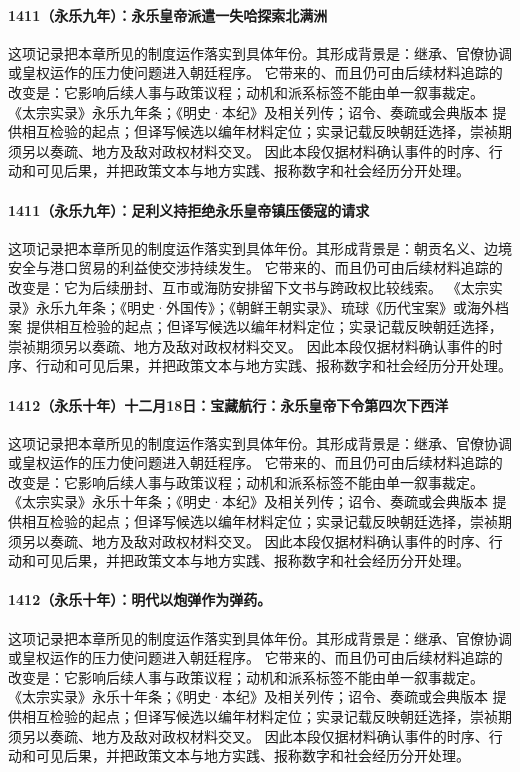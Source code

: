 \paragraph{1411（永乐九年）：永乐皇帝派遣一失哈探索北满洲} 这项记录把本章所见的制度运作落实到具体年份。其形成背景是：继承、官僚协调或皇权运作的压力使问题进入朝廷程序。 它带来的、而且仍可由后续材料追踪的改变是：它影响后续人事与政策议程；动机和派系标签不能由单一叙事裁定。 《太宗实录》永乐九年条；《明史·本纪》及相关列传；诏令、奏疏或会典版本 提供相互检验的起点；但译写候选以编年材料定位；实录记载反映朝廷选择，崇祯期须另以奏疏、地方及敌对政权材料交叉。 因此本段仅据材料确认事件的时序、行动和可见后果，并把政策文本与地方实践、报称数字和社会经历分开处理。

\paragraph{1411（永乐九年）：足利义持拒绝永乐皇帝镇压倭寇的请求} 这项记录把本章所见的制度运作落实到具体年份。其形成背景是：朝贡名义、边境安全与港口贸易的利益使交涉持续发生。 它带来的、而且仍可由后续材料追踪的改变是：它为后续册封、互市或海防安排留下文书与跨政权比较线索。 《太宗实录》永乐九年条；《明史·外国传》；《朝鲜王朝实录》、琉球《历代宝案》或海外档案 提供相互检验的起点；但译写候选以编年材料定位；实录记载反映朝廷选择，崇祯期须另以奏疏、地方及敌对政权材料交叉。 因此本段仅据材料确认事件的时序、行动和可见后果，并把政策文本与地方实践、报称数字和社会经历分开处理。

\paragraph{1412（永乐十年）十二月18日：宝藏航行：永乐皇帝下令第四次下西洋} 这项记录把本章所见的制度运作落实到具体年份。其形成背景是：继承、官僚协调或皇权运作的压力使问题进入朝廷程序。 它带来的、而且仍可由后续材料追踪的改变是：它影响后续人事与政策议程；动机和派系标签不能由单一叙事裁定。 《太宗实录》永乐十年条；《明史·本纪》及相关列传；诏令、奏疏或会典版本 提供相互检验的起点；但译写候选以编年材料定位；实录记载反映朝廷选择，崇祯期须另以奏疏、地方及敌对政权材料交叉。 因此本段仅据材料确认事件的时序、行动和可见后果，并把政策文本与地方实践、报称数字和社会经历分开处理。

\paragraph{1412（永乐十年）：明代以炮弹作为弹药。} 这项记录把本章所见的制度运作落实到具体年份。其形成背景是：继承、官僚协调或皇权运作的压力使问题进入朝廷程序。 它带来的、而且仍可由后续材料追踪的改变是：它影响后续人事与政策议程；动机和派系标签不能由单一叙事裁定。 《太宗实录》永乐十年条；《明史·本纪》及相关列传；诏令、奏疏或会典版本 提供相互检验的起点；但译写候选以编年材料定位；实录记载反映朝廷选择，崇祯期须另以奏疏、地方及敌对政权材料交叉。 因此本段仅据材料确认事件的时序、行动和可见后果，并把政策文本与地方实践、报称数字和社会经历分开处理。


